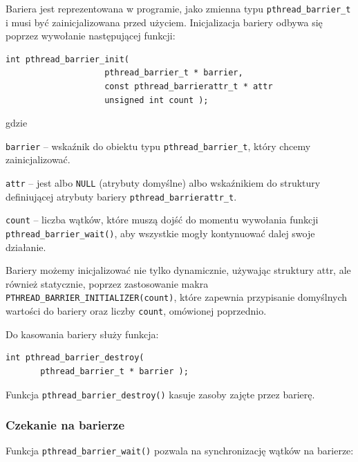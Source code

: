 Bariera jest reprezentowana w programie, jako zmienna typu \lstinline[style=MyCStyle]{pthread_barrier_t} i musi być zainicjalizowana przed użyciem. Inicjalizacja bariery odbywa się poprzez wywołanie następującej funkcji:

\begin{lstlisting}[style=MyCStyle]
int pthread_barrier_init(
                    pthread_barrier_t * barrier,
                    const pthread_barrierattr_t * attr
                    unsigned int count );

\end{lstlisting}
gdzie
\begin{myitemize}
\item \lstinline[style=MyCStyle]{barrier} -- wskaźnik do obiektu typu \lstinline[style=MyCStyle]{pthread_barrier_t}, który chcemy zainicjalizować.
\item \lstinline[style=MyCStyle]{attr} -- jest albo \lstinline[style=MyCStyle]{NULL} (atrybuty domyślne) albo wskaźnikiem do struktury definiującej atrybuty bariery \lstinline[style=MyCStyle]{pthread_barrierattr_t}.
\item \lstinline[style=MyCStyle]{count} -- liczba wątków, które muszą dojść do momentu wywołania funkcji \lstinline[style=MyCStyle]{pthread_barrier_wait()}, aby wszystkie mogły kontynuować dalej swoje działanie.
\end{myitemize}

Bariery możemy inicjalizować nie tylko dynamicznie, używając struktury attr, ale również  statycznie, poprzez zastosowanie makra \lstinline[style=MyCStyle]{PTHREAD_BARRIER_INITIALIZER(count)}, które zapewnia przypisanie domyślnych wartości do bariery oraz liczby \lstinline[style=MyCStyle]{count}, omówionej poprzednio.

Do kasowania bariery służy funkcja:

\begin{lstlisting}[style=MyCStyle]
int pthread_barrier_destroy(
       pthread_barrier_t * barrier );
\end{lstlisting}

Funkcja \lstinline[style=MyCStyle]{pthread_barrier_destroy()} kasuje zasoby zajęte przez barierę.

\subsubsection{Czekanie na barierze}

Funkcja  \lstinline[style=MyCStyle]{pthread_barrier_wait()} pozwala na synchronizację wątków na barierze:

